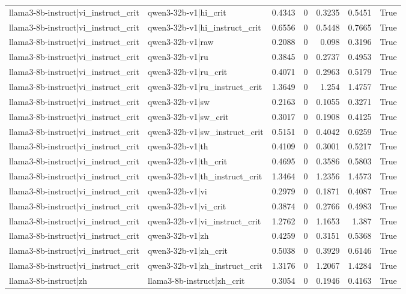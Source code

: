 \begin{table}
\begin{tabular}{l l r r r r l}
llama3-8b-instruct|vi_instruct_crit & qwen3-32b-v1|hi_crit & 0.4343 & 0 & 0.3235 & 0.5451 & True \\
llama3-8b-instruct|vi_instruct_crit & qwen3-32b-v1|hi_instruct_crit & 0.6556 & 0 & 0.5448 & 0.7665 & True \\
llama3-8b-instruct|vi_instruct_crit & qwen3-32b-v1|raw & 0.2088 & 0 & 0.098 & 0.3196 & True \\
llama3-8b-instruct|vi_instruct_crit & qwen3-32b-v1|ru & 0.3845 & 0 & 0.2737 & 0.4953 & True \\
llama3-8b-instruct|vi_instruct_crit & qwen3-32b-v1|ru_crit & 0.4071 & 0 & 0.2963 & 0.5179 & True \\
llama3-8b-instruct|vi_instruct_crit & qwen3-32b-v1|ru_instruct_crit & 1.3649 & 0 & 1.254 & 1.4757 & True \\
llama3-8b-instruct|vi_instruct_crit & qwen3-32b-v1|sw & 0.2163 & 0 & 0.1055 & 0.3271 & True \\
llama3-8b-instruct|vi_instruct_crit & qwen3-32b-v1|sw_crit & 0.3017 & 0 & 0.1908 & 0.4125 & True \\
llama3-8b-instruct|vi_instruct_crit & qwen3-32b-v1|sw_instruct_crit & 0.5151 & 0 & 0.4042 & 0.6259 & True \\
llama3-8b-instruct|vi_instruct_crit & qwen3-32b-v1|th & 0.4109 & 0 & 0.3001 & 0.5217 & True \\
llama3-8b-instruct|vi_instruct_crit & qwen3-32b-v1|th_crit & 0.4695 & 0 & 0.3586 & 0.5803 & True \\
llama3-8b-instruct|vi_instruct_crit & qwen3-32b-v1|th_instruct_crit & 1.3464 & 0 & 1.2356 & 1.4573 & True \\
llama3-8b-instruct|vi_instruct_crit & qwen3-32b-v1|vi & 0.2979 & 0 & 0.1871 & 0.4087 & True \\
llama3-8b-instruct|vi_instruct_crit & qwen3-32b-v1|vi_crit & 0.3874 & 0 & 0.2766 & 0.4983 & True \\
llama3-8b-instruct|vi_instruct_crit & qwen3-32b-v1|vi_instruct_crit & 1.2762 & 0 & 1.1653 & 1.387 & True \\
llama3-8b-instruct|vi_instruct_crit & qwen3-32b-v1|zh & 0.4259 & 0 & 0.3151 & 0.5368 & True \\
llama3-8b-instruct|vi_instruct_crit & qwen3-32b-v1|zh_crit & 0.5038 & 0 & 0.3929 & 0.6146 & True \\
llama3-8b-instruct|vi_instruct_crit & qwen3-32b-v1|zh_instruct_crit & 1.3176 & 0 & 1.2067 & 1.4284 & True \\
llama3-8b-instruct|zh & llama3-8b-instruct|zh_crit & 0.3054 & 0 & 0.1946 & 0.4163 & True \\

\end{tabular}
\end{table}
